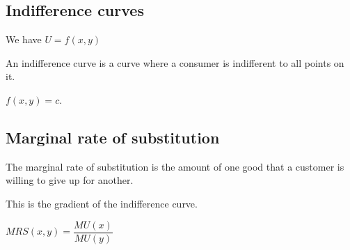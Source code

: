 
\subsection{Indifference curves}

We have \(U=f(x,y)\)

An indifference curve is a curve where a consumer is indifferent to all points on it.

\(f(x,y)=c\).

\subsection{Marginal rate of substitution}

The marginal rate of substitution is the amount of one good that a customer is willing to give up for another.

This is the gradient of the indifference curve.

\(MRS(x, y)=\dfrac{MU(x)}{MU(y)}\)

